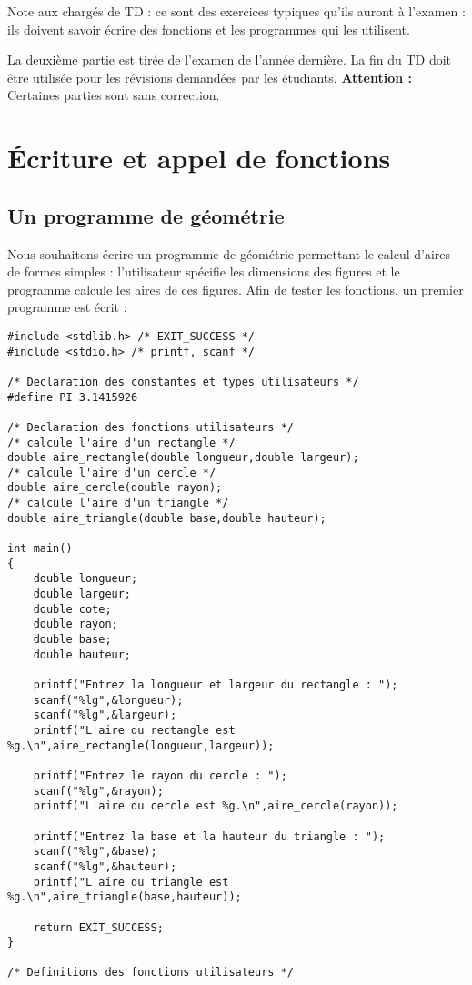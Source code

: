 
\newcommand{\commentaire}[1]{}


\vspace{-1,8cm}

\begin{correction}
  Note aux chargés de TD : ce sont des exercices typiques qu'ils auront à l'examen : ils doivent savoir écrire des fonctions et les programmes qui les utilisent.

La deuxième partie est tirée de l'examen de l'année dernière. La fin du TD doit être utilisée pour les révisions demandées par les étudiants.
\textbf{Attention : }Certaines parties sont sans correction.
\end{correction}

\section{Écriture et appel de fonctions}

\subsection{Un programme de géométrie}

Nous souhaitons écrire un programme de géométrie permettant le calcul d'aires de formes simples : l'utilisateur spécifie les dimensions des figures et le programme calcule les aires de ces figures. Afin de tester les fonctions, un premier programme est écrit :
\begin{footnotesize}
\begin{verbatim}
#include <stdlib.h> /* EXIT_SUCCESS */
#include <stdio.h> /* printf, scanf */

/* Declaration des constantes et types utilisateurs */
#define PI 3.1415926

/* Declaration des fonctions utilisateurs */
/* calcule l'aire d'un rectangle */
double aire_rectangle(double longueur,double largeur);
/* calcule l'aire d'un cercle */ 
double aire_cercle(double rayon);
/* calcule l'aire d'un triangle */ 
double aire_triangle(double base,double hauteur);

int main()
{
    double longueur;
    double largeur;
    double cote; 
    double rayon;
    double base;
    double hauteur;

    printf("Entrez la longueur et largeur du rectangle : ");
    scanf("%lg",&longueur);
    scanf("%lg",&largeur);
    printf("L'aire du rectangle est %g.\n",aire_rectangle(longueur,largeur));

    printf("Entrez le rayon du cercle : ");
    scanf("%lg",&rayon);
    printf("L'aire du cercle est %g.\n",aire_cercle(rayon));

    printf("Entrez la base et la hauteur du triangle : ");
    scanf("%lg",&base);
    scanf("%lg",&hauteur);
    printf("L'aire du triangle est %g.\n",aire_triangle(base,hauteur));

    return EXIT_SUCCESS;
}

/* Definitions des fonctions utilisateurs */
\end{verbatim}
\end{footnotesize}


